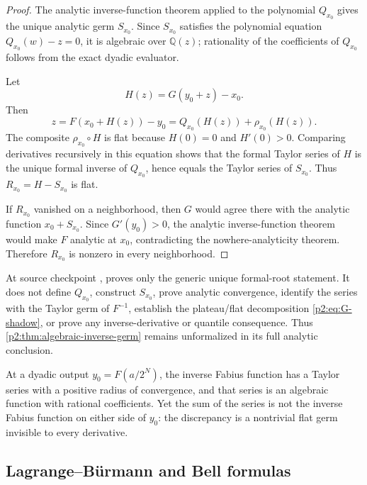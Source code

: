 \documentclass[11pt,oneside]{article}
\numberwithin{equation}{section}
\theoremstyle{definition}
\theoremstyle{remark}
\newcommand{\Q}{\mathbb Q}
\newcommand{\InvF}{G}
\begin{document}
\begin{proof}
The analytic inverse-function theorem applied to the polynomial $Q_{x_0}$ gives the unique analytic
germ $S_{x_0}$.  Since $S_{x_0}$ satisfies the polynomial equation
$Q_{x_0}(w)-z=0$, it is algebraic over $\Q(z)$; rationality of the coefficients of $Q_{x_0}$ follows
from the exact dyadic evaluator.

Let
\[
 H(z)=\InvF(y_0+z)-x_0.
\]
Then
\[
 z=F(x_0+H(z))-y_0=Q_{x_0}(H(z))+\rho_{x_0}(H(z)).
\]
The composite $\rho_{x_0}\circ H$ is flat because $H(0)=0$ and $H'(0)>0$.  Comparing derivatives
recursively in this equation shows that the formal Taylor series of $H$ is the unique formal inverse
of $Q_{x_0}$, hence equals the Taylor series of $S_{x_0}$.  Thus $R_{x_0}=H-S_{x_0}$ is flat.

If $R_{x_0}$ vanished on a neighborhood, then $\InvF$ would agree there with the analytic function
$x_0+S_{x_0}$.  Since $\InvF'(y_0)>0$, the analytic inverse-function theorem would make $F$
analytic at $x_0$, contradicting the nowhere-analyticity theorem.  Therefore $R_{x_0}$ is nonzero in
every neighborhood.
\end{proof}

\begin{resultbox}
At source checkpoint
,
 proves only the generic unique formal-root
statement.  It does not define $Q_{x_0}$, construct $S_{x_0}$, prove analytic
convergence, identify the series with the Taylor germ of $F^{-1}$, establish
the plateau/flat decomposition \eqref{p2:eq:G-shadow}, or prove any
inverse-derivative or quantile consequence.  Thus
\cref{p2:thm:algebraic-inverse-germ} remains unformalized in its full analytic
conclusion.
\end{resultbox}

\begin{resultbox}
At a dyadic output $y_0=F(a/2^N)$, the inverse Fabius function has a Taylor series with a positive
radius of convergence, and that series is an algebraic function with rational coefficients.  Yet the
sum of the series is not the inverse Fabius function on either side of $y_0$: the discrepancy is a
nontrivial flat germ invisible to every derivative.
\end{resultbox}

\subsection{Lagrange--B\"urmann and Bell formulas}
\end{document}
